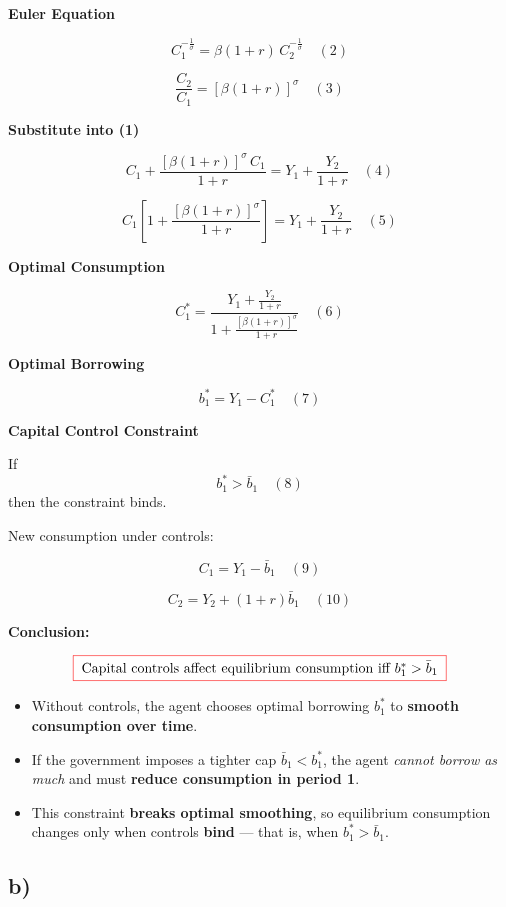 \documentclass[12pt]{article}
\begin{document}
\textbf{Euler Equation}

\[
C_1^{-\tfrac{1}{\sigma}} = \beta(1+r)\, C_2^{-\tfrac{1}{\sigma}} \quad (2)
\]

\[
\frac{C_2}{C_1} = [\beta(1+r)]^{\sigma} \quad (3)
\]

\textbf{Substitute into (1)}

\[
C_1 + \frac{[\beta(1+r)]^{\sigma} \, C_1}{1+r} = Y_1 + \frac{Y_2}{1+r} \quad (4)
\]

\[
C_1 \left[ 1 + \frac{[\beta(1+r)]^{\sigma}}{1+r} \right] = Y_1 + \frac{Y_2}{1+r} \quad (5)
\]

\textbf{Optimal Consumption}

\[
C_1^* = \frac{Y_1 + \tfrac{Y_2}{1+r}}{1 + \tfrac{[\beta(1+r)]^{\sigma}}{1+r}} \quad (6)
\]

\textbf{Optimal Borrowing}

\[
b_1^* = Y_1 - C_1^* \quad (7)
\]

\textbf{Capital Control Constraint}

If  
\[
b_1^* > \bar{b}_1 \quad (8)
\]  
then the constraint binds.  

New consumption under controls:  

\[
C_1 = Y_1 - \bar{b}_1 \quad (9)
\]

\[
C_2 = Y_2 + (1+r)\bar{b}_1 \quad (10)
\]

\textbf{Conclusion:}

\[
\fcolorbox{red}{white}{$
\; \text{Capital controls affect equilibrium consumption iff } b_1^* > \bar{b}_1 \;
$}
\]


\begin{itemize}
    \item Without controls, the agent chooses optimal borrowing \( b_1^* \) to \textbf{smooth consumption over time}.
    
    \item If the government imposes a tighter cap \( \bar{b}_1 < b_1^* \), the agent \textit{cannot borrow as much} and must \textbf{reduce consumption in period 1}.
    
    \item This constraint \textbf{breaks optimal smoothing}, so equilibrium consumption changes only when controls \textbf{bind} — that is, when \( b_1^* > \bar{b}_1 \).
\end{itemize}


\subsection*{\noindent\textbf{b)}}
\end{document}
